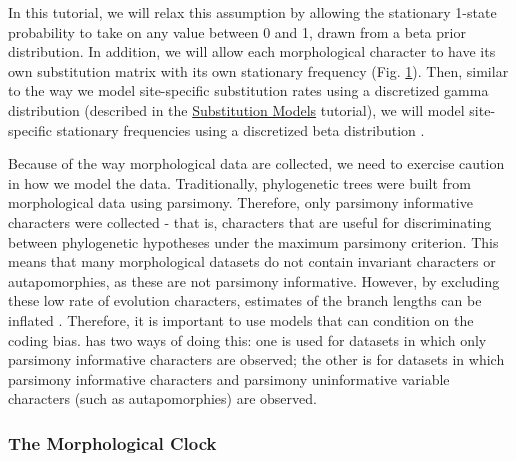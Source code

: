 In this tutorial, we will relax this assumption by allowing the stationary 1-state probability to take on any value between 0 and 1, drawn from a beta prior distribution.
In addition, we will allow each morphological character to have its own substitution matrix with its own stationary frequency (Fig. \ref{fig:morpho_gm}).
Then, similar to the way we model site-specific substitution rates using a discretized gamma distribution (described in the \href{https://github.com/revbayes/revbayes_tutorial/raw/master/tutorial_TeX/RB_CTMC_Tutorial/RB_CTMC_Tutorial.pdf}{Substitution Models} tutorial), we will model site-specific stationary frequencies using a discretized beta distribution \citep{Wright2016}.

Because of the way morphological data are collected, we need to exercise caution in how we model the data. 
Traditionally, phylogenetic trees were built from morphological data using parsimony. 
Therefore, only parsimony informative characters were collected - that is, characters that are useful for discriminating between phylogenetic hypotheses under the maximum parsimony criterion.
This means that many morphological datasets do not contain invariant characters or autapomorphies, as these are not parsimony informative. 
However, by excluding these low rate of evolution characters, estimates of the branch lengths can be inflated \citep{Felsenstein1992,Lewis2001}.
Therefore, it is important to use models that can condition on the coding bias. 
\RevBayes has two ways of doing this: one is used for datasets in which only parsimony informative characters are observed; the other is for datasets in which parsimony informative characters and parsimony uninformative variable characters (such as autapomorphies) are observed.
\begin{figure}[h!]
\label{fig:morpho_gm}
\end{figure}

\subsubsection{The Morphological Clock}\label{subsub:Intro-MorphClock}

